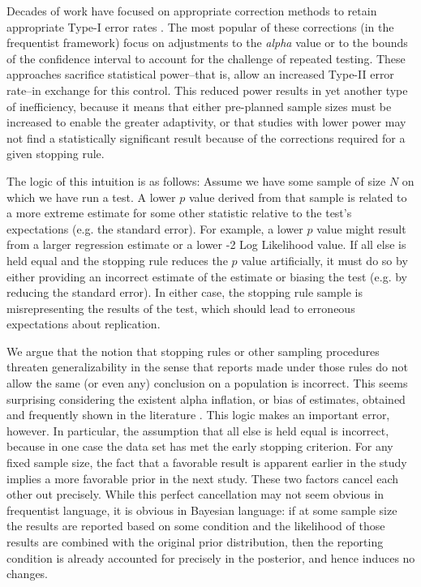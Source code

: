 \documentclass[man]{apa7}
\theoremstyle{definition}
\begin{document}
Decades of work have focused on appropriate correction methods to retain appropriate Type-I error rates \parencite[see][for an overview]{shaffer1995multiple}. The most popular of these corrections (in the frequentist framework) focus on adjustments to the \textit{alpha} value or to the bounds of the confidence interval to account for the challenge of repeated testing\parencite[see, e.g.][]{pocock1977group, o1979multiple}.  These approaches sacrifice statistical power--that is, allow an increased Type-II error rate--in exchange for this control.  This reduced power results in yet another type of inefficiency, because it means that either pre-planned sample sizes must be increased to enable the greater adaptivity, or that studies with lower power may not find a statistically significant result because of the corrections required for a given stopping rule.

The logic of this intuition is as follows: Assume we have some sample of size $N$ on which we have run a test.  A lower $p$ value derived from that sample is related to a more extreme estimate for some other statistic relative to the test's expectations (e.g. the standard error).  For example, a lower $p$ value might result from a larger regression estimate or a lower -2 Log Likelihood value.  If all else is held equal and the stopping rule reduces the $p$ value artificially, it must do so by either providing an incorrect estimate of the estimate or biasing the test (e.g. by reducing the standard error).  In either case, the stopping rule sample is misrepresenting the results of the test, which should lead to erroneous expectations about replication.

We argue that the notion that stopping rules or other sampling procedures threaten generalizability in the sense that reports made under those rules do not allow the same (or even any) conclusion on a population is incorrect.  This seems surprising considering the existent alpha inflation, or bias of estimates, obtained and frequently shown in the literature \parencite{ioannidis2005most}. This logic makes an important error, however.  In particular, the assumption that all else is held equal is incorrect, because in one case the data set has met the early stopping criterion.  For any fixed sample size, the fact that a favorable result is apparent earlier in the study implies a more favorable prior in the next study.  These two factors cancel each other out precisely.  While this perfect cancellation may not seem obvious in frequentist language, it is obvious in Bayesian language: if at some sample size the results are reported based on some condition and the likelihood of those results are combined with the original prior distribution, then the reporting condition is already accounted for precisely in the posterior, and hence induces no changes. 
\end{document}
